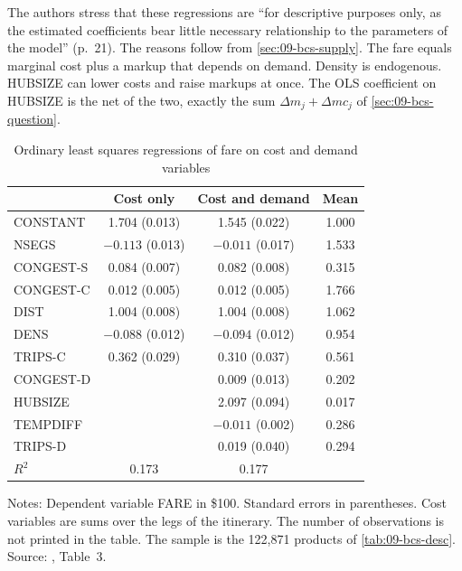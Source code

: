 The authors stress that these regressions are ``for descriptive purposes only, as the estimated coefficients
bear little necessary relationship to the parameters of the model'' (p.~21). The reasons follow from
\cref{sec:09-bcs-supply}. The fare equals marginal cost plus a markup that depends on demand. Density is
endogenous. HUBSIZE can lower costs and raise markups at once. The OLS coefficient on HUBSIZE is the net
of the two, exactly the sum $\Delta m_j+\Delta mc_j$ of \cref{sec:09-bcs-question}.

\begin{table}[htbp]
\centering
\begin{threeparttable}
\caption{Ordinary least squares regressions of fare on cost and demand variables}
\label{tab:09-bcs-ols}
\small
\begin{tabular}{@{}lccc@{}}
\toprule
 & Cost only & Cost and demand & Mean \\
\midrule
CONSTANT & 1.704 (0.013) & 1.545 (0.022) & 1.000 \\
NSEGS & $-0.113$ (0.013) & $-0.011$ (0.017) & 1.533 \\
CONGEST-S & 0.084 (0.007) & 0.082 (0.008) & 0.315 \\
CONGEST-C & 0.012 (0.005) & 0.012 (0.005) & 1.766 \\
DIST & 1.004 (0.008) & 1.004 (0.008) & 1.062 \\
DENS & $-0.088$ (0.012) & $-0.094$ (0.012) & 0.954 \\
TRIPS-C & 0.362 (0.029) & 0.310 (0.037) & 0.561 \\
CONGEST-D & & 0.009 (0.013) & 0.202 \\
HUBSIZE & & 2.097 (0.094) & 0.017 \\
TEMPDIFF & & $-0.011$ (0.002) & 0.286 \\
TRIPS-D & & 0.019 (0.040) & 0.294 \\
\addlinespace
$R^2$ & 0.173 & 0.177 & \\
\bottomrule
\end{tabular}
\begin{tablenotes}\footnotesize
\item Notes: Dependent variable FARE in \$100. Standard errors in parentheses. Cost variables are sums over
the legs of the itinerary. The number of observations is not printed in the table. The sample is the
122,871 products of \cref{tab:09-bcs-desc}. Source: \citet{BerryCarnallSpiller1996}, Table~3.
\end{tablenotes}
\end{threeparttable}
\end{table}

